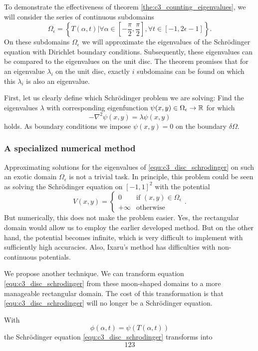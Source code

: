 To demonstrate the effectiveness of theorem \ref{the:c3_counting_eigenvalues}, we will consider the series of continuous subdomains
$$
    \Omega_\epsilon = \left\{T(\alpha, t) | \forall \alpha \in \left[-\frac{\pi}{2}, \frac{\pi}{2}\right], \forall t \in [-1, 2\epsilon - 1]  \right\}\text{.}
$$
On these subdomains $\Omega_\epsilon$ we will approximate the eigenvalues of the Schrödinger equation with Dirichlet boundary conditions. Subsequently, these eigenvalues can be compared to the eigenvalues on the unit disc. The theorem promises that for an eigenvalue $\lambda_i$ on the unit disc, exactly $i$ subdomains can be found on which this $\lambda_i$ is also an eigenvalue.

First, let us clearly define which Schrödinger problem we are solving: Find the eigenvalues $\lambda$ with corresponding eigenfunction $\psi(x, y) \in \Omega_\epsilon \to \mathbb{R}$ for which
\begin{equation}\label{equ:c3_disc_schrodinger}
-\nabla^2 \psi(x, y) = \lambda \psi(x, y)
\end{equation}
holds. As boundary conditions we impose $\psi(x, y) = 0$ on the boundary $\delta \Omega$.

\subsubsection{A specialized numerical method}

Approximating solutions for the eigenvalues of \eqref{equ:c3_disc_schrodinger} on such an exotic domain $\Omega_\epsilon$ is not a trivial task. In principle, this problem could be seen as solving the Schrödinger equation on $[-1,1]^2$ with the potential
$$
V(x, y) = \begin{cases}
    0 & \text{if $(x, y)\in \Omega_\epsilon$} \\
    +\infty & \text{otherwise}
\end{cases}\text{.}
$$
But numerically, this does not make the problem easier. Yes, the rectangular domain would allow us to employ the earlier developed method. But on the other hand, the potential becomes infinite, which is very difficult to implement with sufficiently high accuracies. Also, Ixaru's method has difficulties with non-continuous potentials.

We propose another technique. We can transform equation \eqref{equ:c3_disc_schrodinger} from these moon-shaped domains to a more manageable rectangular domain. The cost of this transformation is that \eqref{equ:c3_disc_schrodinger} will no longer be a Schrödinger equation. 

With
$$
\phi(\alpha, t) = \psi(T(\alpha, t))
$$
the Schrödinger equation \eqref{equ:c3_disc_schrodinger} transforms into
$$
123
$$




\stopchapter
